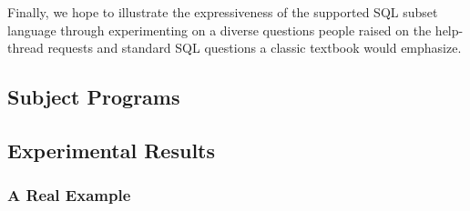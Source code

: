 Finally, we hope to illustrate the expressiveness of the supported SQL
subset language through experimenting on a diverse questions
people raised on the help-thread requests and standard
SQL questions a classic textbook would emphasize.

\subsection{Subject Programs}

\subsection{Experimental Results}

\subsubsection{A Real Example}

